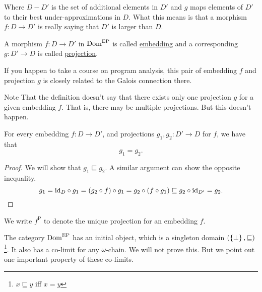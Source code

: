 \begin{enumcirc}
\begin{center}
	\end{center}
	Where $D-D'$ is the set of additional elements in $D'$ and $g$ maps elements of
	$D'$ to their best under-approximations in $D$.
	What this means is that a morphism $f: D \to D'$ is really saying that $D'$ is
	larger than $D$.
	\item
	A morphism $f: D \to D'$ in $\Dom[EP]$ is called \ul{embedding} and a
	corresponding $g: D' \to D$ is called \ul{projection}.

	If you happen to take a course on program analysis, this pair of embedding $f$
	and projection $g$ is closely related to the Galois connection there.

	Note That the definition doesn't say that there exists only one projection $g$
	for a given embedding $f$.
	That is, there may be multiple projections.
	But this doesn't happen.

	\begin{lemma}
		For every embedding $f: D \to D'$, and projections $g_1, g_2: D' \to D$ for
		$f$, we have that
		\[
			g_1 = g_2.
		\]
	\end{lemma}
	\begin{proof}
		We will show that $g_1 \sqsubseteq g_2$.
		A similar argument can show the opposite inequality.
		\[
			g_1 = \id_D \circ g_1 =
			\prths{g_2 \circ f} \circ g_1 =
			g_2 \circ \prths{f \circ g_1} \sqsubseteq
			g_2 \circ \id_{D'} =
			g_2.
		\]
	\end{proof}
	We write $f^\textrm{P}$ to denote the unique projection for an embedding $f$.
	\item
	The category $\Dom[EP]$ has an initial object, which is a singleton domain
	$\prths{\braces{\bot}, \sqsubseteq}$\footnote{$x \sqsubseteq y$ iff $x = y$}.
	It also has a co-limit for any $\omega$-chain.
	We will not prove this.
	But we point out one important property of these co-limits.


\end{enumcirc}
